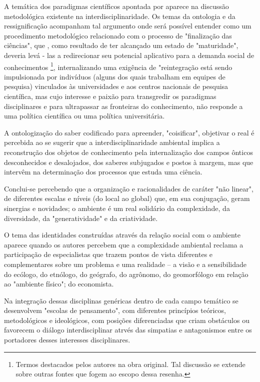 \documentclass[
   article,       %
   12pt,          %
   oneside,       %
   a4paper,       %
   english,       %
   brazil,           %
   sumario=tradicional
   ]{abntex2}
\begin{document}
A temática dos paradigmas científicos apontada por \cite{Kuhn2012-oa} aparece na discussão metodológica existente na interdisciplinaridade. Os temas da ontologia e da ressignificação acompanham tal argumento onde será possível entender como um procedimento metodológico relacionado com o processo de "finalização das ciências", que , como resultado de ter alcançado um estado de "maturidade", deveria levá - las a redirecionar seu potencial aplicativo para a demanda social de conhecimentos \footnote{Termos destacados pelos autores na obra original. Tal discussão se extende sobre outras fontes que fogem ao escopo dessa resenha.}, internalizando uma exigência de "reintegração está sendo impulsionada por indivíduos (alguns dos quais trabalham em equipes de pesquisa) vinculados às universidades e aos centros nacionais de pesquisa científica, mas cujo interesse e paixão para transgredir os paradigmas disciplinares e para ultrapassar as fronteiras do conhecimento, não responde a uma política científica ou uma política universitária. 

A ontologização do saber codificado para apreender, "coisificar", objetivar o real é percebida ao se sugerir que a interdisciplinaridade ambiental implica a reconstrução dos objetos de conhecimento pela internalização dos campos ônticos desconhecidos e desalojados, dos saberes subjugados e postos à margem, mas que intervêm na determinação dos processos que estuda uma ciência. 

Conclui-se percebendo que a organização e racionalidades de caráter "não linear", de diferentes escalas e níveis (do local ao global) que, em sua conjugação, geram sinergias e novidades; o ambiente é um real solidário da complexidade, da diversidade, da "generatividade" e da criatividade.

O tema das identidades construídas através da relação social com o ambiente aparece quando os autores percebem que a complexidade ambiental reclama a participação de especialistas que trazem pontos de vista diferentes e complementares sobre um problema e uma realidade – a visão e a sensibilidade do ecólogo, do etnólogo, do geógrafo, do agrônomo, do geomorfólogo em relação ao "ambiente físico"; do economista. 

Na integração dessas disciplinas genéricas dentro de cada campo temático se desenvolvem "escolas de pensamento", com diferentes princípios teóricos, metodológicos e ideológicos, com posições diferenciadas que criam obstáculos ou favorecem o diálogo interdisciplinar atrvés das simpatias e antagonismos entre os portadores desses interesses disciplinares. 
\end{document}
